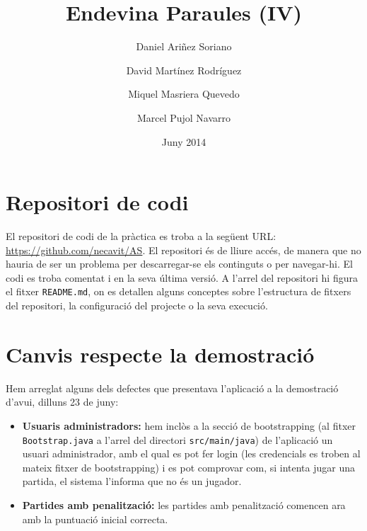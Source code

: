 \documentclass[a4paper]{scrartcl}
\title{Endevina Paraules (IV)}
\date{Juny 2014}
\author{Daniel Ariñez Soriano}
\author{David Martínez Rodríguez}
\author{Miquel Masriera Quevedo}
\author{Marcel Pujol Navarro\vspace{11cm}}
\affil{Arquitectura del Software\\Facultat d'Informàtica de Barcelona, UPC}
\begin{document}
	
	\maketitle
	
	
	\thispagestyle{empty}
	\newpage
	\cleardoublepage
	
	\section{Repositori de codi}
	El repositori de codi de la pràctica es troba a la següent URL: \url{https://github.com/necavit/AS}.
	El repositori és de lliure accés, de manera que no hauria de ser un problema per descarregar-se els
	continguts o per navegar-hi.
	El codi es troba comentat i en la seva última versió.
	A l'arrel del repositori hi figura el fitxer \texttt{README.md}, on es detallen alguns conceptes sobre
	l'estructura de fitxers del repositori, la configuració del projecte o la seva execució.
	
	\section{Canvis respecte la demostració}
	Hem arreglat alguns dels defectes que presentava l'aplicació a la demostració d'avui, dilluns 23 de juny:
	\begin{itemize}
		\item \textbf{Usuaris administradors:} hem inclòs a la secció de bootstrapping (al fitxer \texttt{Bootstrap.java}
		a l'arrel del directori \texttt{src/main/java}) de l'aplicació un usuari administrador,
		amb el qual es pot fer login (les credencials es troben al mateix fitxer de bootstrapping) i es pot comprovar
		com, si intenta jugar una partida, el sistema l'informa que no és un jugador.
		\item \textbf{Partides amb penalització:} les partides amb penalització comencen ara amb la puntuació inicial
		correcta.
	\end{itemize}
	
\end{document}
